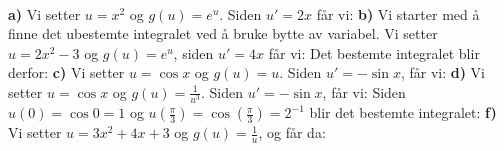  \\
\textbf{a)} Vi setter $ u=x^2 $ og $ g(u)=e^u $. Siden $ u'=2x $ får vi:
\textbf{b)} Vi starter med å finne det ubestemte integralet ved å bruke bytte av variabel. Vi setter $ u=2x^2-3$ og $ g(u)=e^u $, siden $ u'=4x $ får vi:
Det bestemte integralet blir derfor:
\textbf{c)} Vi setter $ {u=\cos x} $ og $ {g(u)=u} $. Siden $ u'=-\sin x $, får vi:
\textbf{d)} Vi setter $ u=\cos x $ og $ g(u)=\frac{1}{u^3} $. Siden $ u'=-\sin x $, får vi:
Siden $ u(0)=\cos 0=1 $ og $ u(\frac{\pi}{3})=\cos\left(\frac{\pi}{3}\right)=2^{-1} $ blir det bestemte integralet:
\textbf{f)} Vi setter $ u=3x^2+4x+3 $ og $ g(u)=\frac{1}{u} $, og får da:


